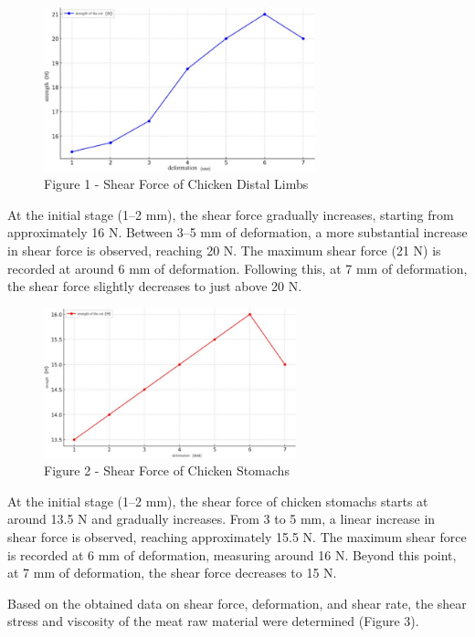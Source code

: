 \begin{figure}[H]
	\centering
	\includegraphics[width=0.7\textwidth]{media/pish/image9}
	\caption*{Figure 1 - Shear Force of Chicken Distal Limbs}
\end{figure}

\begin{multicols}{2}
At the initial stage (1--2 mm), the shear force gradually increases,
starting from approximately 16 N. Between 3--5 mm of deformation, a more
substantial increase in shear force is observed, reaching 20 N. The
maximum shear force (21 N) is recorded at around 6 mm of deformation.
Following this, at 7 mm of deformation, the shear force slightly
decreases to just above 20 N.
\end{multicols}

\begin{figure}[H]
	\centering
	\includegraphics[width=0.65\textwidth]{media/pish/image10}
	\caption*{Figure 2 - Shear Force of Chicken Stomachs}
\end{figure}

\begin{multicols}{2}
At the initial stage (1--2 mm), the shear force of chicken stomachs
starts at around 13.5 N and gradually increases. From 3 to 5 mm, a
linear increase in shear force is observed, reaching approximately 15.5
N. The maximum shear force is recorded at 6 mm of deformation, measuring
around 16 N. Beyond this point, at 7 mm of deformation, the shear force
decreases to 15 N.

Based on the obtained data on shear force, deformation, and shear rate,
the shear stress and viscosity of the meat raw material were determined
(Figure 3).
\end{multicols}

